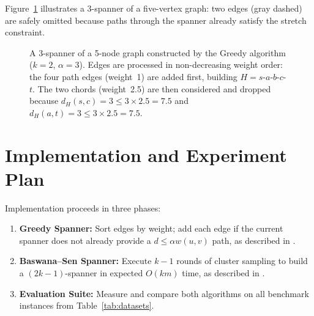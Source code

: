 \documentclass[11pt,a4paper,twocolumn]{article}
\begin{document}
Figure~\ref{fig:spanner} illustrates a 3-spanner of a
five-vertex graph: two edges (gray dashed) are safely omitted
because paths through the spanner already satisfy the stretch
constraint.

\begin{figure}[t]
\centering
{}
\caption{A 3-spanner of a 5-node graph constructed by the Greedy
algorithm ($k=2$, $\alpha=3$). Edges are processed in
non-decreasing weight order: the four path edges (weight~1) are
added first, building $H = s$-$a$-$b$-$c$-$t$. The two chords
(weight~2.5) are then considered and dropped because
$d_H(s,c) = 3 \leq 3 \times 2.5 = 7.5$ and
$d_H(a,t) = 3 \leq 3 \times 2.5 = 7.5$.}
\label{fig:spanner}
\end{figure}

\section{Implementation and Experiment Plan}

Implementation proceeds in three phases:

\begin{enumerate}[leftmargin=*, topsep=2pt, itemsep=1pt]
  \item \textbf{Greedy Spanner:} Sort edges by weight; add each
    edge if the current spanner does not already provide a
    $d \leq \alpha w(u,v)$ path, as described in
    \citet{chimani2022spanner}.
  \item \textbf{Baswana--Sen Spanner:} Execute $k{-}1$ rounds of
    cluster sampling to build a $(2k-1)$-spanner in expected
    $O(km)$ time, as described in \citet{chimani2022spanner}.
  \item \textbf{Evaluation Suite:} Measure and compare both
    algorithms on all benchmark instances from
    Table~\ref{tab:datasets}.
\end{enumerate}
\end{document}
